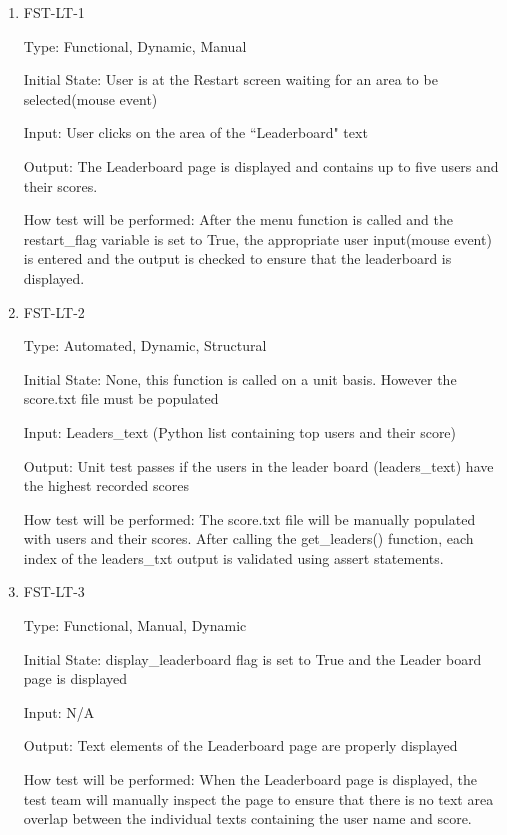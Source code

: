 \documentclass[12pt, titlepage]{article}
\begin{document}
\begin{enumerate}

\item{FST-LT-1\\}

Type: Functional, Dynamic, Manual
					
Initial State: User is at the Restart screen waiting for an area to be selected(mouse event)
					
Input: User clicks on the area of the ``Leaderboard" text
					
Output: The Leaderboard page is displayed and contains up to five users and their scores.
					
How test will be performed: After the menu function is called and the restart\_flag variable is set to True, the appropriate user input(mouse event) is entered and the output is checked to ensure that the leaderboard is displayed. 
					

\item{FST-LT-2\\}

Type: Automated, Dynamic, Structural
					
Initial State: None, this function is called on a unit basis. However the score.txt file must be populated
					
Input: Leaders\_text (Python list containing top users and their score)
					
Output: Unit test passes if the users in the leader board (leaders\_text) have the highest recorded scores
					
How test will be performed: The score.txt file will be manually populated with users and their scores. After calling the get\_leaders() function, each index of the leaders\_txt output is validated using assert statements.

\item{FST-LT-3\\}

Type: Functional, Manual, Dynamic 
					
Initial State: display\_leaderboard flag is set to True and the Leader board page is displayed
					
Input: N/A
					
Output: Text elements of the Leaderboard page are properly displayed
					
How test will be performed: When the Leaderboard page is displayed, the test team will manually inspect the page to 
ensure that there is no text area overlap between the individual texts containing the user name and score. 



\end{enumerate}
\end{document}
